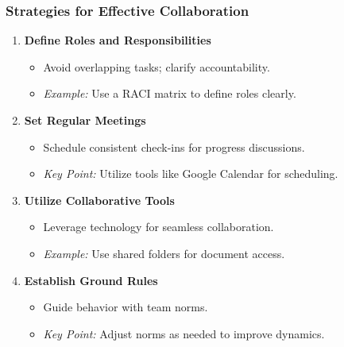 \documentclass{beamer}
\begin{document}
\begin{frame}[fragile]
    \frametitle{Strategies for Effective Collaboration}
    \begin{enumerate}
        \item \textbf{Define Roles and Responsibilities}
            \begin{itemize}
                \item Avoid overlapping tasks; clarify accountability.
                \item \textit{Example:} Use a RACI matrix to define roles clearly.
            \end{itemize}

        \item \textbf{Set Regular Meetings}
            \begin{itemize}
                \item Schedule consistent check-ins for progress discussions.
                \item \textit{Key Point:} Utilize tools like Google Calendar for scheduling.
            \end{itemize}

        \item \textbf{Utilize Collaborative Tools}
            \begin{itemize}
                \item Leverage technology for seamless collaboration.
                \item \textit{Example:} Use shared folders for document access.
            \end{itemize}

        \item \textbf{Establish Ground Rules}
            \begin{itemize}
                \item Guide behavior with team norms.
                \item \textit{Key Point:} Adjust norms as needed to improve dynamics.
            \end{itemize}
    \end{enumerate}
\end{frame}
\end{document}
